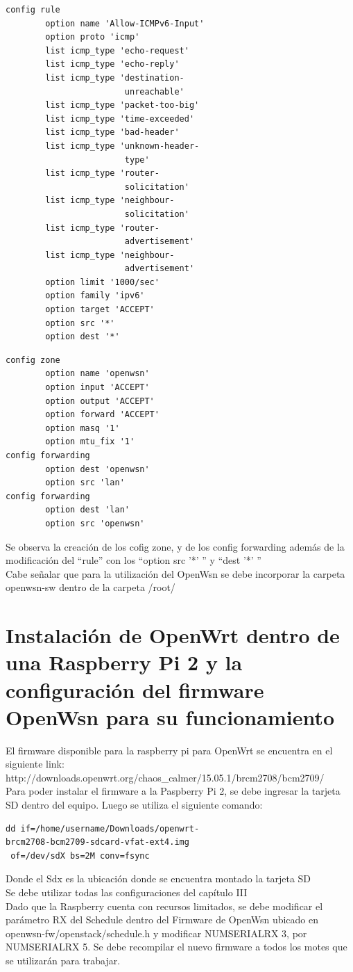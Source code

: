 \documentclass[journal]{IEEEtran}
\begin{document}
\begin{lstlisting}[frame=single]
config rule
        option name 'Allow-ICMPv6-Input'
        option proto 'icmp'
        list icmp_type 'echo-request'
        list icmp_type 'echo-reply'
        list icmp_type 'destination-
                        unreachable'
        list icmp_type 'packet-too-big'
        list icmp_type 'time-exceeded'
        list icmp_type 'bad-header'
        list icmp_type 'unknown-header-
                        type'
        list icmp_type 'router-
                        solicitation'
        list icmp_type 'neighbour-
                        solicitation'
        list icmp_type 'router-
                        advertisement'
        list icmp_type 'neighbour-
                        advertisement'
        option limit '1000/sec'
        option family 'ipv6'
        option target 'ACCEPT'
        option src '*'
        option dest '*'
\end{lstlisting}
\newpage
\begin{lstlisting}[frame=single]        
config zone
        option name 'openwsn'
        option input 'ACCEPT'
        option output 'ACCEPT'
        option forward 'ACCEPT'
        option masq '1'
        option mtu_fix '1'
config forwarding
        option dest 'openwsn'
        option src 'lan'
config forwarding
        option dest 'lan'
        option src 'openwsn'
\end{lstlisting}
Se observa la creación de los cofig zone, y de los config forwarding además de la modificación del ``rule'' con los ``option src '*' '' y ``dest '*' ''
\ \\
Cabe señalar que para la utilización del OpenWsn se debe incorporar la carpeta openwsn-sw dentro de la carpeta /root/
\section{Instalación de OpenWrt dentro de una Raspberry Pi 2 y la configuración del firmware OpenWsn para su funcionamiento}
El firmware disponible para la raspberry pi para OpenWrt se encuentra en el siguiente link:
http://downloads.openwrt.org/chaos\_calmer/15.05.1/brcm2708/bcm2709/
\\
Para poder instalar el firmware a la Paspberry Pi 2, se debe ingresar la tarjeta SD dentro del equipo. Luego se utiliza el siguiente comando:
\begin{lstlisting}[frame=single]
dd if=/home/username/Downloads/openwrt-
brcm2708-bcm2709-sdcard-vfat-ext4.img
 of=/dev/sdX bs=2M conv=fsync
\end{lstlisting}
Donde el Sdx es la ubicación donde se encuentra montado la tarjeta SD
\ \\
Se debe utilizar todas las configuraciones del capítulo III
\ \\
Dado que la Raspberry cuenta con recursos limitados, se debe modificar el parámetro RX del Schedule dentro del Firmware de OpenWsn ubicado en openwsn-fw/openstack/schedule.h y modificar NUMSERIALRX 3,  por NUMSERIALRX 5. Se debe recompilar el nuevo firmware a todos los motes que se utilizarán para trabajar.
\end{document}

